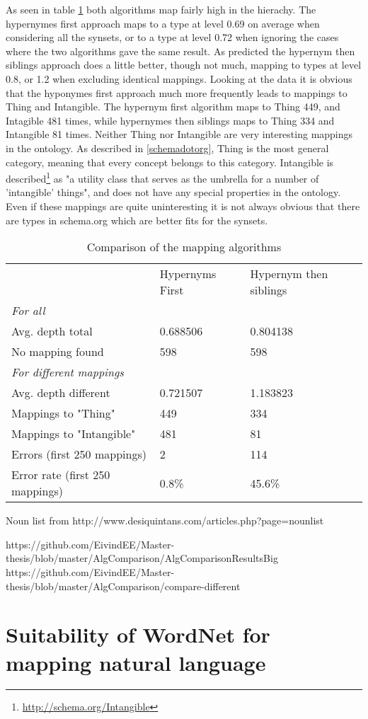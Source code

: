 As seen in table \ref{table:AlgorithmComparison} both algorithms map fairly high in the hierachy.
The hypernymes first approach maps to a type at level 0.69 on average when considering all the synsets,
or to a type at level 0.72 when ignoring the cases where the two algorithms gave the same result.
As predicted the hypernym then siblings approach does a little better, though not much,
mapping to types at level 0.8, or 1.2 when excluding identical mappings.
Looking at the data it is obvious that the hyponymes first approach much more frequently leads to mappings to Thing and Intangible.
The hypernym first algorithm maps to Thing 449, and Intagible 481 times,
while hypernymes then siblings maps to Thing 334 and Intangible 81 times.
Neither Thing nor Intangible are very interesting mappings in the ontology.
As described in \ref{schemadotorg}, Thing is the most general category, meaning that every concept belongs to this category.
Intangible is described\footnote{\url{http://schema.org/Intangible}} as "a utility class that serves as the umbrella for a number of 'intangible' things",
and does not have any special properties in the ontology.
Even if these mappings are quite uninteresting it is not always obvious that there are types in schema.org which are better fits for the synsets.


\begin{table}[h]
	\centering
	\begin{tabular}{lll}
										& Hypernyms First 	& Hypernym then siblings	\\
		\emph{For all}					&					&							\\
		Avg. depth total				& 0.688506 			& 0.804138					\\
		No mapping found				& 598				& 598						\\
		\emph{For different mappings}	&					&							\\
		Avg. depth different			& 0.721507			& 1.183823					\\
		Mappings to "Thing"				& 449				& 334						\\
		Mappings to "Intangible"		& 481				& 81						\\
		Errors (first 250 mappings)		& 2 				& 114 						\\
		Error rate (first 250 mappings)	& 0.8\%				& 45.6\%					\\
	\end{tabular}
	\caption{Comparison of the mapping algorithms}
	\label{table:AlgorithmComparison}
\end{table}

Noun list from http://www.desiquintans.com/articles.php?page=nounlist

https://github.com/EivindEE/Master-thesis/blob/master/AlgComparison/AlgComparisonResultsBig
https://github.com/EivindEE/Master-thesis/blob/master/AlgComparison/compare-different
\section{Suitability of WordNet for mapping natural language}
